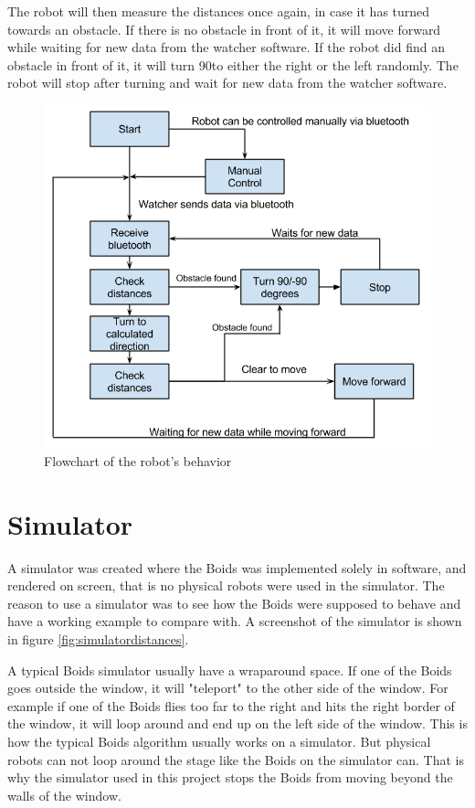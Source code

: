 The robot will then measure the distances once again, in case it has turned towards an obstacle. If there is no obstacle in front of it, it will move forward while waiting for new data from the watcher software. If the robot did find an obstacle in front of it, it will turn 90\textdegree to either the right or the left randomly. The robot will stop after turning and wait for new data from the watcher software. 
\begin{figure}[h!]
\begin{center}
\includegraphics[width=0.8\linewidth]{figs/robotschema}
\end{center}
\caption[Robot flowchart]{Flowchart of the robot's behavior}
\label{fig:robotschema}
\end{figure}
\clearpage

\section{Simulator}
\label{sec:simulator}
A simulator was created where the Boids was implemented solely in software, and rendered on screen, that is no physical robots were used in the simulator. The reason to use a simulator was to see how the Boids were supposed to behave and have a working example to compare with. A screenshot of the simulator is shown in figure \ref{fig:simulatordistances}.

A typical Boids simulator usually have a wraparound space. If one of the Boids goes outside the window, it will "teleport" to the other side of the window. For example if one of the Boids flies too far to the right and hits the right border of the window, it will loop around and end up on the left side of the window. This is how the typical Boids algorithm usually works on a simulator. But physical robots can not loop around the stage like the Boids on the simulator can. That is why the simulator used in this project stops the Boids from moving beyond the walls of the window.

